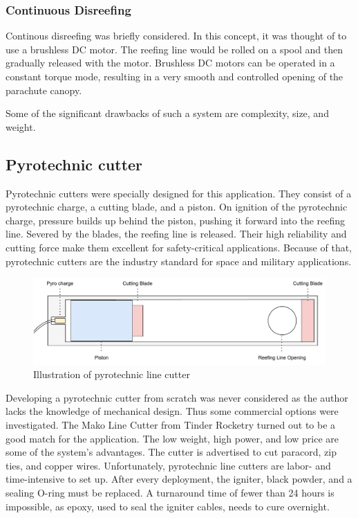 \subsubsection{Continuous Disreefing}
Continous disreefing was briefly considered. In this concept, it was thought of to use a brushless DC motor. The reefing line would be rolled on a spool and then gradually released with the motor. Brushless DC motors can be operated in a constant torque mode, resulting in a very smooth and controlled opening of the parachute canopy.

Some of the significant drawbacks of such a system are complexity, size, and weight.

\newpage

\subsection{Pyrotechnic cutter}
Pyrotechnic cutters were specially designed for this application. They consist of a pyrotechnic charge, a cutting blade, and a piston. On ignition of the pyrotechnic charge, pressure builds up behind the piston, pushing it forward into the reefing line. Severed by the blades, the reefing line is released. Their high reliability and cutting force make them excellent for safety-critical applications. Because of that, pyrotechnic cutters are the industry standard for space and military applications.\cite[Chapter~6.5]{parachute-design}   

\begin{figure}[h!]
	\centering
	\includegraphics[width=\textwidth]{images/pyro-cutter}
	\caption{Illustration of pyrotechnic line cutter}
	\label{fig:pyro-cutter}
\end{figure}

  Developing a pyrotechnic cutter from scratch was never considered as the author lacks the knowledge of mechanical design. Thus some commercial options were investigated. The Mako Line Cutter from Tinder Rocketry turned out to be a good match for the application. The low weight, high power, and low price are some of the system's advantages. The cutter is advertised to cut paracord, zip ties, and copper wires. Unfortunately, pyrotechnic line cutters are labor- and time-intensive to set up. After every deployment, the igniter, black powder, and a sealing O-ring must be replaced. A turnaround time of fewer than 24 hours is impossible, as epoxy, used to seal the igniter cables, needs to cure overnight.

